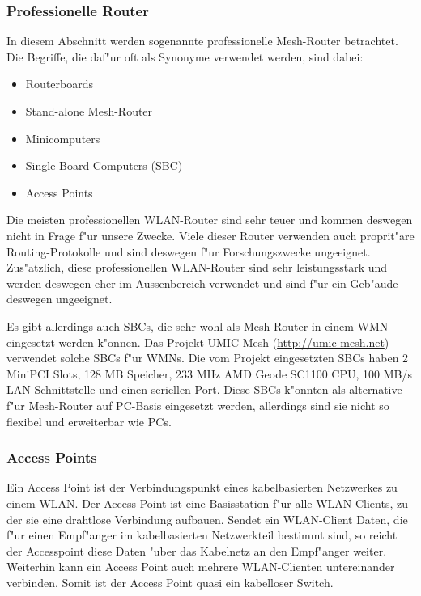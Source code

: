 \subsubsection{Professionelle Router}

In diesem Abschnitt werden sogenannte professionelle Mesh-Router betrachtet. 
Die Begriffe, die daf"ur oft als Synonyme verwendet werden, sind dabei: 

\begin{itemize}	
\item Routerboards
\item Stand-alone Mesh-Router 
\item Minicomputers 
\item Single-Board-Computers (SBC) 
\item Access Points
\end{itemize}

Die meisten professionellen WLAN-Router sind sehr teuer und kommen deswegen
nicht in Frage f"ur unsere Zwecke. Viele dieser Router verwenden auch
proprit"are Routing-Protokolle und sind deswegen f"ur Forschungszwecke
ungeeignet. Zus"atzlich, diese professionellen WLAN-Router sind sehr
leistungsstark und werden deswegen eher im Aussenbereich verwendet und
sind f"ur ein Geb"aude deswegen ungeeignet.

Es gibt allerdings auch SBCs, die sehr wohl als Mesh-Router in einem WMN
eingesetzt werden k"onnen. Das Projekt UMIC-Mesh (\url{http://umic-mesh.net})
verwendet solche SBCs f"ur WMNs. Die vom Projekt eingesetzten SBCs
haben 2 MiniPCI Slots, 128 MB Speicher, 233 MHz AMD Geode SC1100 CPU,
100 MB/s LAN-Schnittstelle und einen seriellen Port. Diese SBCs k"onnten
als alternative f"ur Mesh-Router auf PC-Basis eingesetzt werden, allerdings
sind sie nicht so flexibel und erweiterbar wie PCs.

\subsubsection{Access Points}

Ein Access Point ist der Verbindungspunkt eines kabelbasierten
Netzwerkes zu einem WLAN. Der Access Point ist eine Basisstation f"ur alle
WLAN-Clients, zu der sie eine drahtlose Verbindung aufbauen.
Sendet ein WLAN-Client Daten, die f"ur einen Empf"anger im kabelbasierten
Netzwerkteil bestimmt sind, so reicht der Accesspoint diese Daten "uber
das Kabelnetz an den Empf"anger weiter. Weiterhin kann ein Access Point
auch mehrere WLAN-Clienten untereinander verbinden. Somit ist der Access Point
quasi ein kabelloser Switch.

